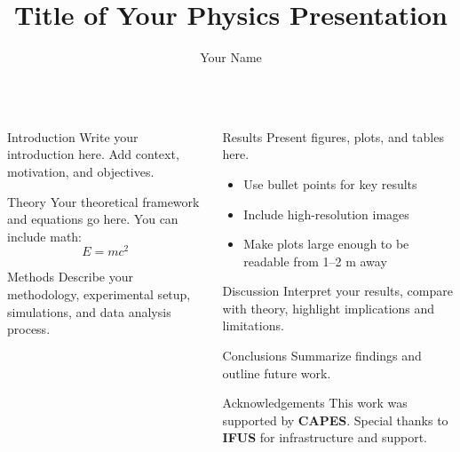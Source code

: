 \documentclass[final]{beamer}
\title{\textbf{Title of Your Physics Presentation}}
\author{Your Name}
\institute{Institute of Physics (IFUS)}
\begin{document}
\begin{frame}[t]

\begin{center}
  {\Huge \bfseries \inserttitle \par}
  \vspace{1cm}
  {\Large \insertauthor \par}
  \vspace{0.5cm}
  {\large \insertinstitute \par}
\end{center}

\vspace{1.5cm}

\begin{columns}[t,totalwidth=\textwidth]

\begin{column}{0.48\textwidth}
  \begin{block}{Introduction}
    Write your introduction here. 
    Add context, motivation, and objectives.
  \end{block}

  \begin{block}{Theory}
    Your theoretical framework and equations go here.
    You can include math:
    \[
      E = mc^2
    \]
  \end{block}

  \begin{block}{Methods}
    Describe your methodology, experimental setup, 
    simulations, and data analysis process.
  \end{block}
\end{column}

\begin{column}{0.48\textwidth}
  \begin{block}{Results}
    Present figures, plots, and tables here.
    \begin{itemize}
      \item Use bullet points for key results
      \item Include high-resolution images
      \item Make plots large enough to be readable from 1–2 m away
    \end{itemize}
  \end{block}

  \begin{block}{Discussion}
    Interpret your results, compare with theory,
    highlight implications and limitations.
  \end{block}

  \begin{block}{Conclusions}
    Summarize findings and outline future work.
  \end{block}

  \begin{block}{Acknowledgements}
    This work was supported by \textbf{CAPES}.  
    Special thanks to \textbf{IFUS} for infrastructure and support.
  \end{block}
\end{column}

\end{columns}
\end{frame}
\end{document}
